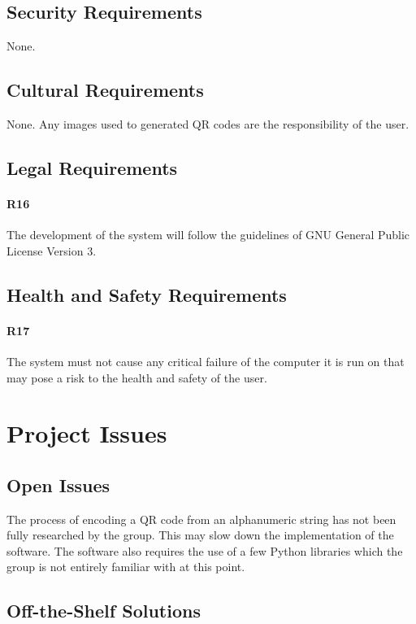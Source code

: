 \documentclass[12pt, titlepage]{article}
\begin{document}
\subsection{Security Requirements}

	None.

\subsection{Cultural Requirements}

	None. Any images used to generated QR codes are the responsibility of the 
	user.

\subsection{Legal Requirements}

	\paragraph{R16}
	The development of the system will follow the guidelines of GNU General 
	Public License Version 3.

\subsection{Health and Safety Requirements}

	\paragraph{R17}
	The system must not cause any critical failure of the computer it is run on 
	that may pose a risk to the health and safety of the user.

\section{Project Issues}

\subsection{Open Issues}

	The process of encoding a QR code from an alphanumeric string has not been 
	fully researched by the group. This may slow down the implementation of the 
	software. The software also requires the use of a few Python libraries 
	which the group is not entirely familiar with at this point.

\subsection{Off-the-Shelf Solutions}
\end{document}
